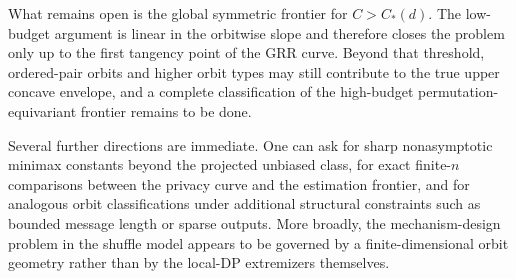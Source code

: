 \documentclass[11pt]{amsart}
\numberwithin{equation}{section}
\theoremstyle{definition}
\begin{document}
What remains open is the global symmetric frontier for \(C>C_\ast(d)\).
The low-budget argument is linear in the orbitwise slope and therefore closes the problem only up to the
first tangency point of the GRR curve.
Beyond that threshold, ordered-pair orbits and higher orbit types may still contribute to the true upper
concave envelope, and a complete classification of the high-budget permutation-equivariant frontier remains
to be done.

Several further directions are immediate.
One can ask for sharp nonasymptotic minimax constants beyond the projected unbiased class, for exact
finite-\(n\) comparisons between the privacy curve and the estimation frontier, and for analogous orbit
classifications under additional structural constraints such as bounded message length or sparse outputs.
More broadly, the mechanism-design problem in the shuffle model appears to be governed by a finite-dimensional
orbit geometry rather than by the local-DP extremizers themselves.
\end{document}
